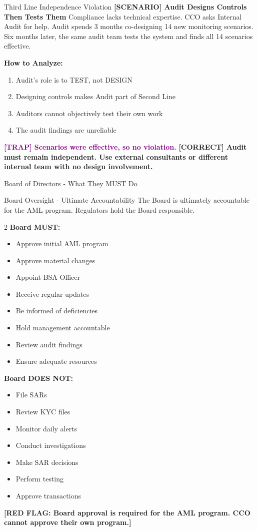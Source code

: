 \documentclass[11pt,a4paper]{beamer}
\newcommand{\trap}[1]{\textcolor{purple}{\textbf{[TRAP] #1}}}
\newcommand{\correct}[1]{\textcolor{green!50!black}{\textbf{[CORRECT] #1}}}
\newcommand{\scenario}[1]{\textcolor{blue!70!black}{\textbf{[SCENARIO] #1}}}
\newcommand{\redflag}[1]{\textcolor{red!80!black}{\textbf{[RED FLAG: #1]}}}
\begin{document}
	\begin{frame}{Third Line Independence Violation}
		\scenario{Audit Designs Controls Then Tests Them}
		Compliance lacks technical expertise. CCO asks Internal Audit for help. Audit spends 3 months co-designing 14 new monitoring scenarios. Six months later, the same audit team tests the system and finds all 14 scenarios effective.
		
		\vspace{0.1cm}
		\textbf{How to Analyze:}
		\begin{enumerate}
			\item Audit's role is to TEST, not DESIGN
			\item Designing controls makes Audit part of Second Line
			\item Auditors cannot objectively test their own work
			\item The audit findings are unreliable
		\end{enumerate}
		\trap{Scenarios were effective, so no violation.}
		\correct{Audit must remain independent. Use external consultants or different internal team with no design involvement.}
	\end{frame}
	
	\begin{frame}{Board of Directors - What They MUST Do}
		\begin{block}{Board Oversight - Ultimate Accountability}
			The Board is ultimately accountable for the AML program. Regulators hold the Board responsible.
		\end{block}
		\begin{multicols}{2}
			\textbf{Board MUST:}
			\begin{itemize}
				\item Approve initial AML program
				\item Approve material changes
				\item Appoint BSA Officer
				\item Receive regular updates
				\item Be informed of deficiencies
				\item Hold management accountable
				\item Review audit findings
				\item Ensure adequate resources
			\end{itemize}
			\columnbreak
			\textbf{Board DOES NOT:}
			\begin{itemize}
				\item File SARs
				\item Review KYC files
				\item Monitor daily alerts
				\item Conduct investigations
				\item Make SAR decisions
				\item Perform testing
				\item Approve transactions
			\end{itemize}
		\end{multicols}
		\redflag{Board approval is required for the AML program. CCO cannot approve their own program.}
	\end{frame}
	
\end{document}
